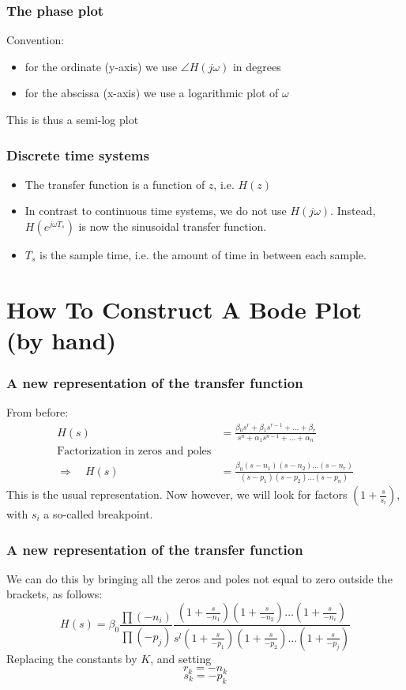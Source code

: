 \begin{frame}
\frametitle{The phase plot}
Convention:
\begin{itemize}
\item for the ordinate (y-axis) we use $\angle H(j\omega)$ in degrees
\item for the abscissa (x-axis) we use a logarithmic plot of $\omega$

\end{itemize}
This is thus a semi-log plot


\end{frame}



\begin{frame}
\frametitle{Discrete time systems}

\begin{itemize}
\item The transfer function is a function of $z$, i.e. $H(z)$
\item In contrast to continuous time systems, we do not use $H(j\omega)$. Instead, $H(e^{j\omega T_s})$ is now the sinusoidal transfer function.
\item $T_s$ is the sample time, i.e. the amount of time in between each sample.
\end{itemize}


\end{frame}

\section{How To Construct A Bode Plot (by hand)}

\begin{frame}
\frametitle{A new representation of the transfer function}
From before:
\begin{align*}
H(s) &= \frac{\beta_0 s^r + \beta_1 s^{r-1} + \ldots + \beta_r}{s^n + \alpha_1 s^{n-1} + \ldots + \alpha_n}\\
\text{Factorization in zeros and poles}\\
\Rightarrow \quad
H(s) &= \frac{\beta_0 (s-n_1) (s-n_2) \ldots (s-n_r)}{(s-p_1) (s-p_2) \ldots (s-p_n)}
\end{align*}
This is the usual representation. Now however, we will look for factors $(1+\displaystyle{\frac{s}{s_i}})$, with $s_i$ a so-called breakpoint.


\end{frame}


\begin{frame}
\frametitle{A new representation of the transfer function}
We can do this by bringing all the zeros and poles not equal to zero outside the brackets, as follows:
$$H(s) = \beta_0 \frac{\prod(-n_i)}{\prod(-p_j)} \frac{(1+\frac{s}{-n_1}) (1+\frac{s}{-n_2}) \ldots (1+\frac{s}{-n_i})}{s^l (1+\frac{s}{-p_1}) (1+\frac{s}{-p_2}) \ldots (1 + \frac{s}{-p_j})}$$
 Replacing the constants by $K$, and setting $$r_k = -n_k$$ $$ s_k = -p_k$$ 



\end{frame}



